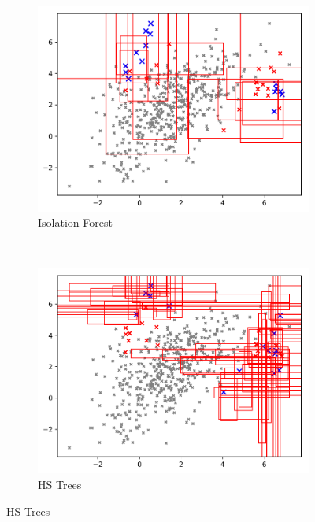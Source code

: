 \documentclass{article} %
\begin{document}
\begin{figure}
	\centering
	\begin{subfigure}[b]{0.3\textwidth}
		\includegraphics[width=\textwidth]{leaf_trees/query_candidate_regions_ntop5_100_trees_iforest}
		\caption{Isolation Forest}
		\label{fig:iforest_rects}
	\end{subfigure}
	~ %
	\begin{subfigure}[b]{0.3\textwidth}
		\includegraphics[width=\textwidth]{leaf_trees/query_candidate_regions_ntop5_50_trees_hstrees}
		\caption{HS Trees}
		\label{fig:hstrees_rects}
	\end{subfigure}

\end{figure}
\end{document}

